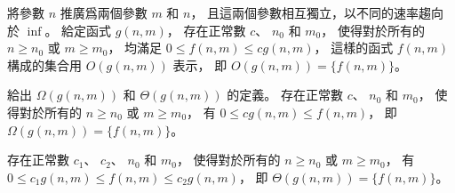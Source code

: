 \startEXERCISE
將參數 $n$ 推廣爲兩個參數 $m$ 和 $n$，
且這兩個參數相互獨立，以不同的速率趨向於 $\inf$。
給定函式 $g(n,m)$，
存在正常數 $c$、 $n_0$ 和 $m_0$，
使得對於所有的 $n\ge n_0$ 或 $m\ge m_0$，
均滿足 $0 \le f(n,m) \le cg(n,m)$，
這樣的函式 $f(n,m)$ 構成的集合用 $O(g(n,m))$ 表示，
即 $O(g(n,m))=\{f(n,m)\}$。

給出 $\Omega(g(n,m))$ 和 $\Theta(g(n,m))$ 的定義。
\stopEXERCISE
\startANSWER
存在正常數 $c$、 $n_0$ 和 $m_0$，
使得對於所有的 $n\ge n_0$ 或 $m\ge m_0$，
有 $0 \le cg(n,m) \le f(n,m)$，
即 $\Omega(g(n,m)) = \{f(n,m)\}$。

存在正常數 $c_1$、 $c_2$、 $n_0$ 和 $m_0$，
使得對於所有的 $n\ge n_0$ 或 $m\ge m_0$，
有 $0 \le c_1 g(n,m) \le f(n,m) \le c_2 g(n,m)$，
即 $\Theta(g(n,m)) = \{f(n,m)\}$。
\stopANSWER
